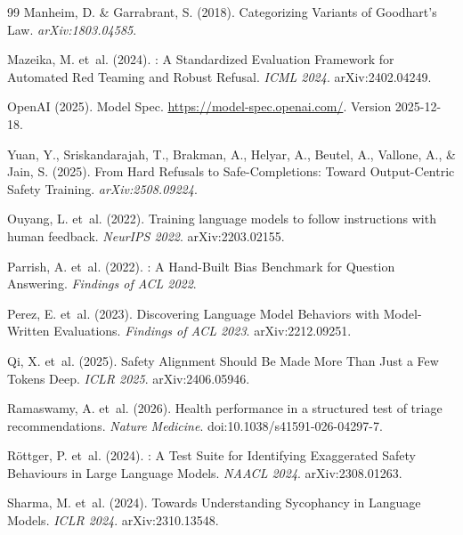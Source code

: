 \documentclass{article}
\begin{document}
\begin{thebibliography}{99}
Manheim, D. \& Garrabrant, S. (2018).
\newblock Categorizing Variants of {Goodhart's} Law.
\newblock \emph{arXiv:1803.04585}.

Mazeika, M. et~al. (2024).
: A Standardized Evaluation Framework for Automated Red Teaming and Robust Refusal.
\newblock \emph{ICML 2024}. arXiv:2402.04249.

OpenAI (2025).
\newblock Model Spec.
\newblock \url{https://model-spec.openai.com/}. Version 2025-12-18.

Yuan, Y., Sriskandarajah, T., Brakman, A., Helyar, A., Beutel, A., Vallone, A., \& Jain, S. (2025).
\newblock From Hard Refusals to Safe-Completions: Toward Output-Centric Safety Training.
\newblock \emph{arXiv:2508.09224}.

Ouyang, L. et~al. (2022).
\newblock Training language models to follow instructions with human feedback.
\newblock \emph{NeurIPS 2022}. arXiv:2203.02155.

Parrish, A. et~al. (2022).
: A Hand-Built Bias Benchmark for Question Answering.
\newblock \emph{Findings of ACL 2022}.

Perez, E. et~al. (2023).
\newblock Discovering Language Model Behaviors with Model-Written Evaluations.
\newblock \emph{Findings of ACL 2023}. arXiv:2212.09251.

Qi, X. et~al. (2025).
\newblock Safety Alignment Should Be Made More Than Just a Few Tokens Deep.
\newblock \emph{ICLR 2025}. arXiv:2406.05946.

Ramaswamy, A. et~al. (2026).
 Health performance in a structured test of triage recommendations.
\newblock \emph{Nature Medicine}.
doi:10.1038/s41591-026-04297-7.

R\"{o}ttger, P. et~al. (2024).
: A Test Suite for Identifying Exaggerated Safety Behaviours in Large Language Models.
\newblock \emph{NAACL 2024}. arXiv:2308.01263.

Sharma, M. et~al. (2024).
\newblock Towards Understanding Sycophancy in Language Models.
\newblock \emph{ICLR 2024}. arXiv:2310.13548.


\end{thebibliography}
\end{document}
